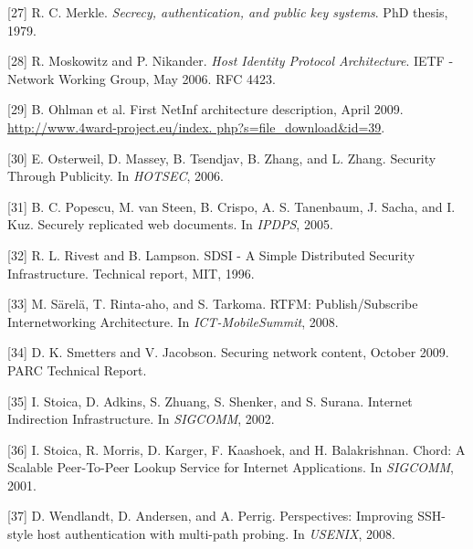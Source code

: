 [27] R. C. Merkle. \emph{Secrecy, authentication, and public key
systems}. PhD thesis, 1979.

[28] R. Moskowitz and P. Nikander. \emph{Host Identity Protocol
Architecture}. IETF - Network Working Group, May 2006.
RFC 4423.

[29] B. Ohlman et al. First NetInf architecture description, April
2009. \url{http://www.4ward-project.eu/index.
php?s=file_download&id=39}.

[30] E. Osterweil, D. Massey, B. Tsendjav, B. Zhang, and
L. Zhang. Security Through Publicity. In \emph{HOTSEC}, 2006.

[31] B. C. Popescu, M. van Steen, B. Crispo, A. S. Tanenbaum,
J. Sacha, and I. Kuz. Securely replicated web documents. In
\emph{IPDPS}, 2005.

[32] R. L. Rivest and B. Lampson. SDSI - A Simple Distributed
Security Infrastructure. Technical report, MIT, 1996.

[33] M. Särelä, T. Rinta-aho, and S. Tarkoma. RTFM:
Publish/Subscribe Internetworking Architecture. In
\emph{ICT-MobileSummit}, 2008.

[34] D. K. Smetters and V. Jacobson. Securing network content,
October 2009. PARC Technical Report.

[35] I. Stoica, D. Adkins, S. Zhuang, S. Shenker, and S. Surana.
Internet Indirection Infrastructure. In \emph{SIGCOMM}, 2002.

[36] I. Stoica, R. Morris, D. Karger, F. Kaashoek, and
H. Balakrishnan. Chord: A Scalable Peer-To-Peer Lookup
Service for Internet Applications. In \emph{SIGCOMM}, 2001.

[37] D. Wendlandt, D. Andersen, and A. Perrig. Perspectives: Improving SSH-style host authentication with multi-path
probing. In \emph{USENIX}, 2008.